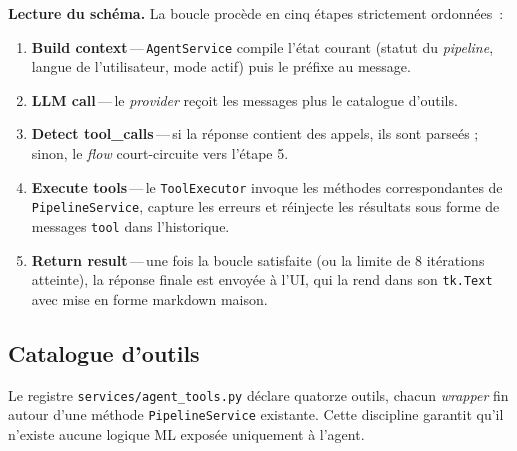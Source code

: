 \documentclass[11pt,a4paper]{report}
\begin{document}
\textbf{Lecture du sch\'ema.} La boucle proc\`ede en cinq \'etapes
strictement ordonn\'ees~:

\begin{enumerate}
    \item \textbf{Build context}\,---\,\texttt{AgentService} compile
        l'\'etat courant (statut du \textit{pipeline}, langue de
        l'utilisateur, mode actif) puis le pr\'efixe au message.
    \item \textbf{LLM call}\,---\,le \textit{provider} re\c{c}oit les
        messages plus le catalogue d'outils.
    \item \textbf{Detect tool\_calls}\,---\,si la r\'eponse contient
        des appels, ils sont parse\'es ; sinon, le \textit{flow}
        court-circuite vers l'\'etape 5.
    \item \textbf{Execute tools}\,---\,le \texttt{ToolExecutor}
        invoque les m\'ethodes correspondantes de
        \texttt{PipelineService}, capture les erreurs et r\'einjecte
        les r\'esultats sous forme de messages \texttt{tool} dans
        l'historique.
    \item \textbf{Return result}\,---\,une fois la boucle satisfaite
        (ou la limite de 8 it\'erations atteinte), la r\'eponse
        finale est envoy\'ee \`a l'UI, qui la rend dans son
        \texttt{tk.Text} avec mise en forme markdown maison.
\end{enumerate}

\subsection{Catalogue d'outils}

Le registre \texttt{services/agent\_tools.py} d\'eclare quatorze
outils, chacun \textit{wrapper} fin autour d'une m\'ethode
\texttt{PipelineService} existante. Cette discipline garantit qu'il
n'existe aucune logique ML expos\'ee uniquement \`a l'agent.
\end{document}
